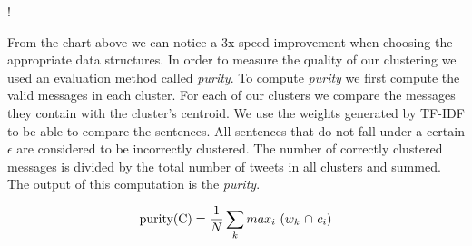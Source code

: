 \resizebox {\columnwidth} {!} {
}

From the chart above we can notice a 3x speed improvement when choosing the appropriate data structures.
\newline
\newline
In order to measure the quality of our clustering we used an evaluation method called \textit{purity}. To compute \textit{purity} we first compute the valid messages in each cluster. For each of our clusters we compare the messages they contain with the cluster's centroid. We use the weights generated by TF-IDF to be able to compare the sentences. All sentences that do not fall under a certain $\epsilon$ are considered to be incorrectly clustered. The number of correctly clustered messages is divided by the total number of tweets in all clusters and summed. The output of this computation is the \textit{purity}.

\begin{equation}
	\text{purity(C)} = {{1 \over N}  \sum_k \textrm{$max_i$ ($w_k$ $\cap$ $c_i$)}}
\end{equation}

